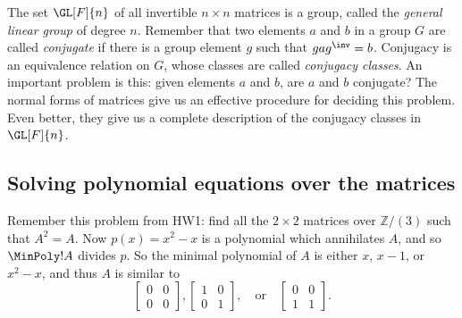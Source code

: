 \documentclass{memoir}
\begin{document}
The set $\GL[F]{n}$ of all invertible $n \times n$ matrices is a group, called the \emph{general linear group} of degree $n$. Remember that two elements $a$ and $b$ in a group $G$ are called \emph{conjugate} if there is a group element $g$ such that $gag^\inv = b$. Conjugacy is an equivalence relation on $G$, whose classes are called \emph{conjugacy classes}. An important problem is this: given elements $a$ and $b$, are $a$ and $b$ conjugate? The normal forms of matrices give us an effective procedure for deciding this problem. Even better, they give us a complete description of the conjugacy classes in $\GL[F]{n}$.

\subsection*{Solving polynomial equations over the matrices}

Remember this problem from HW1: find all the $2 \times 2$ matrices over $\mathbb{Z}/(3)$ such that $A^2 = A$. Now $p(x) = x^2-x$ is a polynomial which annihilates $A$, and so $\MinPoly!{A}$ divides $p$. So the minimal polynomial of $A$ is either $x$, $x-1$, or $x^2-x$, and thus $A$ is similar to \[ \begin{bmatrix} 0 & 0 \\ 0 & 0 \end{bmatrix}, \begin{bmatrix} 1 & 0 \\ 0 & 1 \end{bmatrix}, \quad \text{or} \quad \begin{bmatrix} 0 & 0 \\ 1 & 1 \end{bmatrix}. \]
\end{document}
